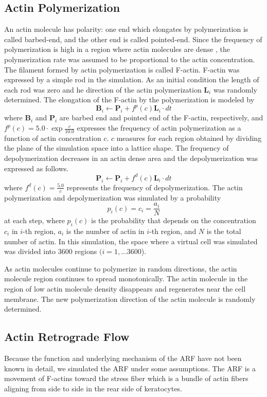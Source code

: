 \documentclass[a4paper,12pt, oneside]{book}
\begin{document}
\subsection{Actin Polymerization}
An actin molecule has polarity: one end which elongates by  polymerization is called barbed-end, and the other end is called pointed-end.
Since the frequency of polymerization is high in a region where actin molecules are dense \cite{yumura1998spatiotemporal}, the polymerization rate was assumed to be  proportional to the actin concentration.
The filament formed by actin polymerization is called F-actin.
F-actin was expressed by a simple  rod in the simulation. 
As an initial condition the length of each rod was zero and he direction of the actin polymerization $\bm{L}_i$ was  randomly determined.
The elongation of the F-actin by the polymerization is modeled by
\begin{equation}
\bm{B}_i \gets \bm{P}_i + f^p(c)\bm{L}_i \cdot dt
\end{equation}
where $\bm{B}_i$ and $\bm{P}_i$ are barbed end and pointed end of the F-actin, respectively, and $f^p(c) = 5.0 \cdot \exp{\frac{c}{10.0}}$ expresses the frequency of actin polymerization as a function of actin concentration $c$.
$c$ measures for each region obtained by dividing the plane of the simulation space into a lattice shape.
The frequency of depolymerization decreases in an actin dense area and the depolymerization was expressed  as follows.
\begin{equation}
\bm{P}_i \gets \bm{P}_i + f^d(c)\bm{L}_i \cdot dt
\end{equation}
where $f^d(c) = \frac{5.0}{c}$ represents the frequency of depolymerization. 
The actin polymerization and depolymerization was simulated by a probability  \[p_i(c) = c_i = \frac{a_i}{N}\] at each step, where $p_i(c)$ is the probability that depends on the concentration $c_i$ in $i$-th region, $a_i$ is the number of actin in $i$-th region, and $N$ is the total number of actin.
In this simulation, the space where a virtual cell was simulated was divided into $3600$ regions $(i = 1,...3600$).

As actin molecules continue to polymerize in random directions, the actin molecule region continues to spread monotonically.
The actin molecule in the region of low actin molecule density disappears and regenerates near the cell membrane.
The new polymerization direction of the actin molecule is randomly determined.

\subsection{Actin Retrograde Flow}
Because the function and underlying mechanism of the ARF have not been known in detail, we simulated the ARF under some assumptions. The ARF is a movement of F-actins toward the  stress fiber which is a bundle of actin fibers aligning from side to side in the rear side of keratocytes. 
\end{document}
